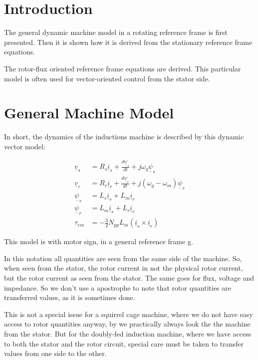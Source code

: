 \documentclass[]{book}
\begin{document}
\hypertarget{introduction}{%
\section{Introduction}\label{introduction}}

The general dynamic machine model in a rotating reference frame is first presented. Then it is shown how it is derived from the stationary reference frame equations.

The rotor-flux oriented reference frame equations are derived. This particular model is often used for vector-oriented control from the stator side.

\hypertarget{general-machine-model}{%
\section{General Machine Model}\label{general-machine-model}}

In short, the dynamics of the inductions machine is described by this dynamic vector model:

\[
\begin{aligned}
\underline{v}_s & = R_s \underline{i}_s + \frac{d\underline{\psi}_s}{dt} + j \omega_g \underline{\psi}_s  \\
\underline{v}_r & = R_r \underline{i}_r + \frac{d\underline{\psi}_r}{dt} + j (\omega_g-\omega_m) \underline{\psi}_r \\
\underline{\psi}_s & = L_s \underline{i}_s + L_m \underline{i}_r\\
\underline{\psi}_r & = L_m \underline{i}_s + L_r \underline{i}_r\\
\tau_{em} &= - \frac{3}{2}N_{pp}L_m(\underline{i}_s  \times \underline{i}_r)
\end{aligned}
\label{eq:genDqMdl}
\]

This model is with motor sign, in a general reference frame g.

In this notation all quantities are seen from the same side of the machine. So, when seen from the stator, the rotor current in not the physical rotor current, but the rotor current as seen from the stator. The same goes for flux, voltage and impedance. So we don't use a apostrophe to note that rotor quantities are transferred values, as it is sometimes done.

This is not a special issue for a squirrel cage machine, where we do not have easy access to rotor quantities anyway, by we practically always look the the machine from the stator. But for the doubly-fed induction machine, where we have access to both the stator and the rotor circuit, special care must be taken to transfer values from one side to the other.
\end{document}

